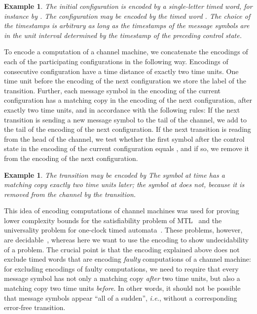 \documentclass{CSML}
\theoremstyle{plain}\newtheorem{theorem}[thm]{Theorem}
\theoremstyle{plain}\newtheorem{corollary}[thm]{Corollary}
\theoremstyle{plain}\newtheorem{example}[thm]{Example}
\theoremstyle{plain}\newtheorem{lemma}[thm]{Lemma}
\theoremstyle{plain}\newtheorem{remark}[thm]{Remark}
\newcommand*\ie{\textit{i.e.}}
\begin{document}
\begin{example}
	The initial configuration  is encoded by a
        single-letter timed word, for instance by . 
The configuration  may be encoded by the timed word . 
The choice of the timestamps is arbitrary as long as the timestamps of the message symbols are in the unit interval determined by the timestamp of the preceding control state. 
\end{example}

To encode a computation of a channel machine, we concatenate the encodings of each of the participating configurations in the following way. 
Encodings of consecutive configuration have a time distance of exactly two time units. 
One time unit before the encoding of the next configuration we store the label of the transition. 
Further, each message symbol in the encoding of the current configuration has a matching copy in the encoding of the next configuration,  after exactly two time units, and in accordance with the following rules: If the next transition is sending a new message symbol  to the tail of the channel, we add  to the tail of the encoding of the next configuration. 
If the next transition is reading  from the head of the channel, we test whether the first symbol after the control state in the encoding of the current configuration equals , and if so, we remove it from the encoding of the next configuration.  
\begin{example}
	The transition  
 may be encoded by  
 The symbol  at time   has a matching copy exactly two time units later; the symbol  at  does not, because it is removed from the channel by the transition. 
\end{example}
This idea of encoding computations of channel machines was used for proving lower complexity bounds for the satisfiability problem of MTL~\cite{DBLP:conf/lics/OuaknineW05} and the universality problem for one-clock timed automata~\cite{DBLP:journals/fuin/AbdullaDOQW08}. 
These problems, however, are decidable~\cite{DBLP:conf/lics/OuaknineW05,DBLP:journals/fuin/AbdullaDOQW08}, whereas here we want to use the encoding to show undecidability of a problem. The crucial point is that the encoding explained above does not exclude timed words that are encoding \emph{faulty} computations of a channel machine: for excluding encodings of faulty computations, we need to require that every message symbol has not only a matching copy \emph{after} two time units, but also a matching copy two time units \emph{before}. In other words, it should not be possible that message symbols appear ``all of a sudden'', \ie, without a corresponding error-free transition.
\end{document}
